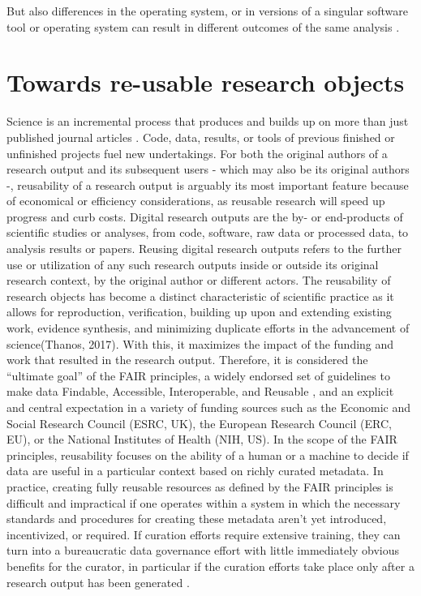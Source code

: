 
But also differences in the operating system, or in versions of a singular software tool or operating system can result in different outcomes of the same analysis \citep{gronenschild2012effects} \citep{glatard2015reproducibility}.


\section{Towards re-usable research objects}

Science is an incremental process that produces and builds up on more than just published journal articles \citep{mons2018data}.
Code, data, results, or tools of previous finished or unfinished projects fuel new undertakings.
For both the original authors of a research output and its subsequent users - which may also be its original authors -, reusability of a research output is arguably its most important feature because of economical or efficiency considerations, as reusable research will speed up progress and curb costs.
Digital research outputs are the by- or end-products of scientific studies or analyses, from code, software, raw data or processed data, to analysis results or papers.
Reusing digital research outputs refers to the further use or utilization of any such research outputs inside or outside its original research context, by the original author or different actors.
The reusability of research objects has become a distinct characteristic of scientific practice as it allows for reproduction, verification, building up upon and extending existing work, evidence synthesis, and minimizing duplicate efforts in the advancement of science(Thanos, 2017).
With this, it maximizes the impact of the funding and work that resulted in the research output.
Therefore, it is considered the “ultimate goal” of the FAIR principles, a widely endorsed set of guidelines to make data Findable, Accessible, Interoperable, and Reusable \citep{wilkinson2016fair}, and an explicit and central expectation in a variety of funding sources such as the Economic and Social Research Council (ESRC, UK), the European Research Council (ERC, EU), or the National Institutes of Health (NIH, US).
In the scope of the FAIR principles, reusability focuses on the ability of a human or a machine to decide if data are useful in a particular context based on richly curated metadata.
In practice, creating fully reusable resources as defined by the FAIR principles is difficult and impractical if one operates within a system in which the necessary standards and procedures for creating these metadata aren’t yet introduced, incentivized, or required.
If curation efforts require extensive training, they can turn into a bureaucratic data governance effort with little immediately obvious benefits for the curator, in particular if the curation efforts take place only after a research output has been generated \citep{zehl2016handling}.

